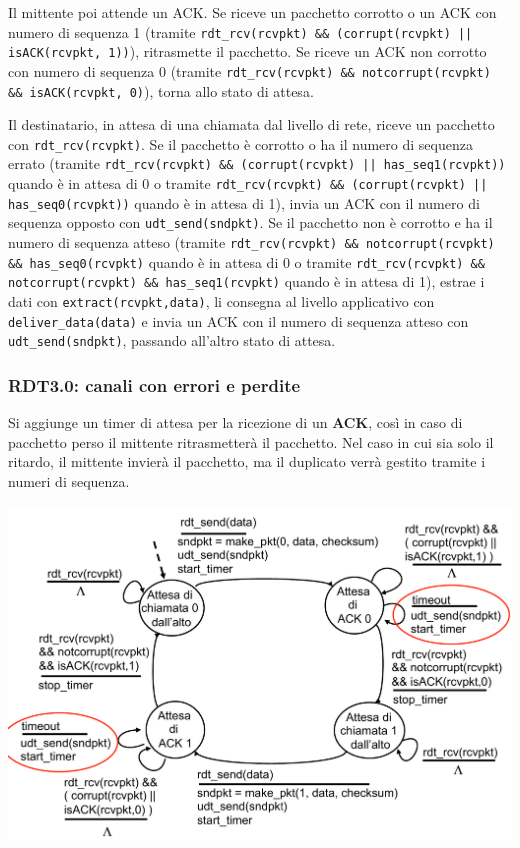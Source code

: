 Il mittente poi attende un ACK. Se riceve un pacchetto corrotto o un ACK con numero di sequenza 1 (tramite \texttt{rdt\_rcv(rcvpkt) \&\& (corrupt(rcvpkt) || isACK(rcvpkt, 1))}), ritrasmette il pacchetto. Se riceve un ACK non corrotto con numero di sequenza 0 (tramite \texttt{rdt\_rcv(rcvpkt) \&\& notcorrupt(rcvpkt) \&\& isACK(rcvpkt, 0)}), torna allo stato di attesa. 

Il destinatario, in attesa di una chiamata dal livello di rete, riceve un pacchetto con \texttt{rdt\_rcv(rcvpkt)}. Se il pacchetto è corrotto o ha il numero di sequenza errato (tramite \texttt{rdt\_rcv(rcvpkt) \&\& (corrupt(rcvpkt) || has\_seq1(rcvpkt))} quando è in attesa di 0 o tramite \texttt{rdt\_rcv(rcvpkt) \&\& (corrupt(rcvpkt) || has\_seq0(rcvpkt))} quando è in attesa di 1), invia un ACK con il numero di sequenza opposto con \texttt{udt\_send(sndpkt)}. Se il pacchetto non è corrotto e ha il numero di sequenza atteso (tramite \texttt{rdt\_rcv(rcvpkt) \&\& notcorrupt(rcvpkt) \&\& has\_seq0(rcvpkt)} quando è in attesa di 0 o tramite \texttt{rdt\_rcv(rcvpkt) \&\& notcorrupt(rcvpkt) \&\& has\_seq1(rcvpkt)} quando è in attesa di 1), estrae i dati con \texttt{extract(rcvpkt,data)}, li consegna al livello applicativo con \texttt{deliver\_data(data)} e invia un ACK con il numero di sequenza atteso con \texttt{udt\_send(sndpkt)}, passando all'altro stato di attesa.

\subsubsection*{RDT3.0: canali con errori e perdite}
Si aggiunge un timer di attesa per la ricezione di un \textbf{ACK}, così in caso di pacchetto perso il mittente ritrasmetterà il pacchetto. Nel caso in cui sia solo il ritardo, il mittente invierà il pacchetto, ma il duplicato verrà gestito tramite i numeri di sequenza.

\begin{center}
\includegraphics[width=\textwidth]{./img/rdt3.0mit.png}
\end{center}

